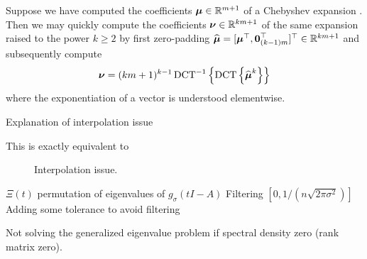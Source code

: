 Suppose we have computed the coefficients $\boldsymbol{\mu} \in \mathbb{R}^{m+1}$
of a Chebyshev expansion .
Then we may quickly compute the coefficients $\boldsymbol{\nu} \in \mathbb{R}^{km+1}$
of the same expansion raised to the power $k \geq 2$ by first zero-padding
$\widehat{\boldsymbol{\mu}} = [\boldsymbol{\mu}^{\top}, \boldsymbol{0}_{(k-1)m}^{\top}]^{\top} \in \mathbb{R}^{km+1}$
and subsequently compute
\begin{equation}
    \boldsymbol{\nu} = (km + 1)^{k - 1} \operatorname{DCT}^{-1}\left\{ \operatorname{DCT}\left\{\widehat{\boldsymbol{\mu}}^{k}\right\} \right\}
    \label{equ:3-nystrom-chebyshev-square-coefficients}
\end{equation}
where the exponentiation of a vector is understood elementwise.

Explanation of interpolation issue \cite{lin2017randomized}

This is exactly equivalent to \cite[Algorithm~5]{lin2017randomized}
\begin{figure}[ht]
    \centering
    
    \caption{Interpolation issue.}
    \label{fig:3-nystrom-interpolation-issue}
\end{figure}

$\Xi(t)$ permutation of eigenvalues of $g_{\sigma}(tI - A)$
Filtering $[0, 1 / (n \sqrt{2 \pi \sigma^2})]$ \cite{lin2017randomized}
Adding some tolerance to avoid filtering

Not solving the generalized eigenvalue problem if spectral density zero (rank matrix zero).

